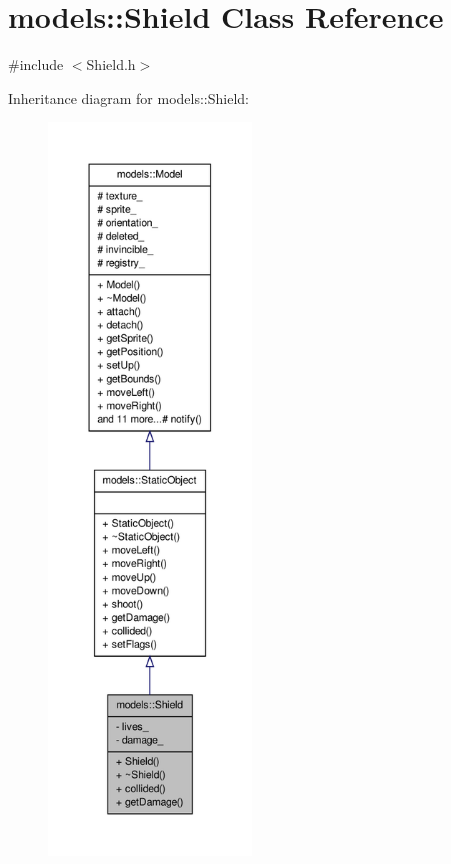 \hypertarget{classmodels_1_1Shield}{\section{models\-:\-:\-Shield \-Class \-Reference}
\label{d1/d8f/classmodels_1_1Shield}
}


{\ttfamily \#include $<$\-Shield.\-h$>$}



\-Inheritance diagram for models\-:\-:\-Shield\-:
\nopagebreak
\begin{figure}[H]
\begin{center}
\leavevmode
\includegraphics[height=550pt]{de/d42/classmodels_1_1Shield__inherit__graph}
\end{center}
\end{figure}


